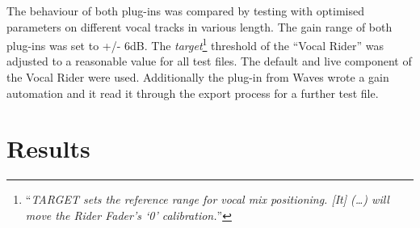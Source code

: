 The behaviour of both plug-ins was compared by testing with optimised parameters on different vocal tracks in various length. The gain range of both plug-ins was set to +/- 6dB. The \textit{target}\footnote{“\textit{TARGET sets the reference range for vocal mix positioning. [It] (…) will move the Rider Fader’s ‘0’ calibration.}”\cite{vocalRiderM}} threshold of the “Vocal Rider” was adjusted to a reasonable value for all test files. The default and live component of the Vocal Rider were used. Additionally the plug-in from Waves wrote a gain automation and it read it through the export process for a further test file.\\

\section{Results}

